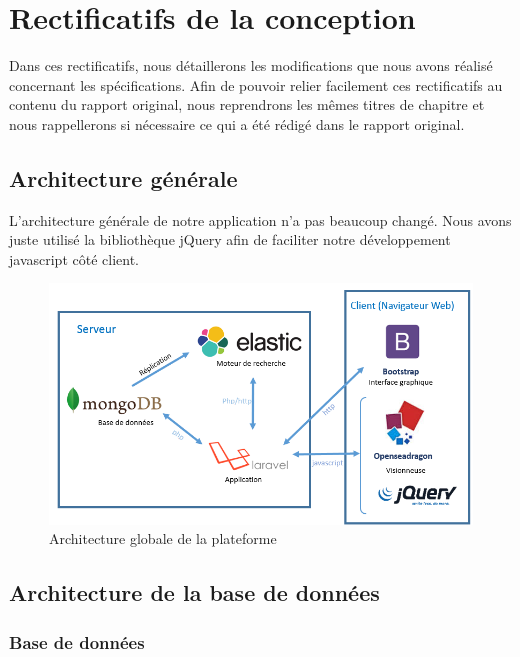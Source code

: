 \section{Rectificatifs de la conception}
\label{sec:majconc}

Dans ces rectificatifs, nous détaillerons les modifications que nous avons réalisé concernant les spécifications\cite{Specs}. Afin de pouvoir relier facilement ces rectificatifs au contenu du rapport original, nous reprendrons les mêmes titres de chapitre et nous rappellerons si nécessaire ce qui a été rédigé dans le rapport original. 

\subsection{Architecture générale}

L'architecture générale de notre application n'a pas beaucoup changé. Nous avons juste utilisé la bibliothèque jQuery afin de faciliter notre développement javascript côté client.

    \begin{figure}[H]
        \centering
        \includegraphics[width=\textwidth]{figure/Archi.png}
            \caption{Architecture globale de la plateforme}
            \label{archi}
    \end{figure}
		
\subsection{Architecture de la base de données}

\subsubsection{Base de données}

